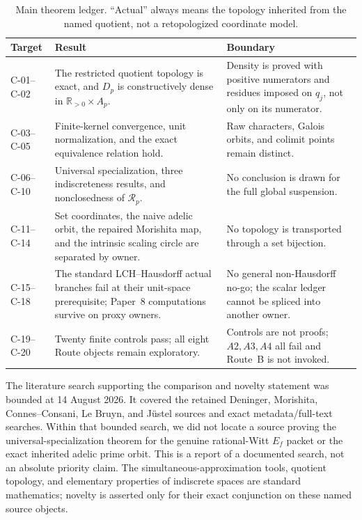 \documentclass[11pt]{article}
\theoremstyle{definition}
\newcommand{\R}{\mathbb{R}}
\newcommand{\Rp}{\mathcal R_p}
\begin{document}
\begin{table}[htbp]
\centering\small
\caption{Main theorem ledger.  ``Actual'' always means the topology inherited from the named quotient, not a retopologized coordinate model.}\label{tab:ledger}
\begin{tabularx}{\textwidth}{P{0.12\textwidth}P{0.25\textwidth}Y}
\toprule
Target & Result & Boundary \\
\midrule
C-01--C-02 & The restricted quotient topology is exact, and \(D_p\) is constructively dense in \(\R_{>0}\times A_p\). & Density is proved with positive numerators and residues imposed on \(q_j\), not only on its numerator.\\
C-03--C-05 & Finite-kernel convergence, unit normalization, and the exact equivalence relation hold. & Raw characters, Galois orbits, and colimit points remain distinct.\\
C-06--C-10 & Universal specialization, three indiscreteness results, and nonclosedness of \(\Rp\). & No conclusion is drawn for the full global suspension.\\
C-11--C-14 & Set coordinates, the naive adelic orbit, the repaired Morishita map, and the intrinsic scaling circle are separated by owner. & No topology is transported through a set bijection.\\
C-15--C-18 & The standard LCH--Hausdorff actual branches fail at their unit-space prerequisite; Paper~8 computations survive on proxy owners. & No general non-Hausdorff no-go; the scalar ledger cannot be spliced into another owner.\\
C-19--C-20 & Twenty finite controls pass; all eight Route objects remain exploratory. & Controls are not proofs; \(A2,A3,A4\) all fail and Route~B is not invoked.\\
\bottomrule
\end{tabularx}
\end{table}

The literature search supporting the comparison and novelty statement was bounded at 14 August 2026.  It covered the retained Deninger, Morishita, Connes--Consani, Le Bruyn, and Jüstel sources and exact metadata/full-text searches.  Within that bounded search, we did not locate a source proving the universal-specialization theorem for the genuine rational-Witt \(E_f\) packet or the exact inherited adelic prime orbit.  This is a report of a documented search, not an absolute priority claim.  The simultaneous-approximation tools, quotient topology, and elementary properties of indiscrete spaces are standard mathematics; novelty is asserted only for their exact conjunction on these named source objects.
\end{document}
